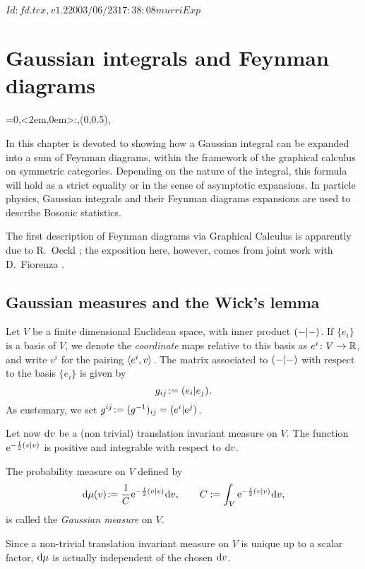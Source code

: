 \RCSID $Id: fd.tex,v 1.2 2003/06/23 17:38:08 murri Exp $


\chapter{Gaussian integrals and Feynman diagrams}
\label{sec:fd}
\everyxy={0,<2em,0em>:,(0,0.5),} %

In this chapter is devoted to showing how a Gaussian integral can be
expanded into a sum of Feynman diagrams, within the framework of the
graphical calculus on symmetric categories.  Depending on the nature
of the integral, this formula will hold as a strict equality or in the
sense of asymptotic expansions. In particle physics, Gaussian
integrals and their Feynman diagrams expansions are used to describe
Bosonic statistics.

The first description of Feynman diagrams via Graphical Calculus is
apparently due to R.~Oeckl \cite{oeckl;braided-qft}; the exposition
here, however, comes from joint work with D.~Fiorenza
\cite{murri-fiorenza;feynman}. 


\section{Gaussian measures and the Wick's lemma} 

Let $V$ be a finite dimensional Euclidean space,
with inner product $( -|- )_{}$. If $\{e_i\}$ is a basis of
$V$, we denote the \emph{coordinate} maps relative to this basis as
$e^i\colon V\to\mathbb{R}$, and write $v^i$ for the pairing
$\langle e^i,v \rangle_{}$.  The matrix associated to $( -|- )_{}$ with
respect to the basis $\{e_i\}$ is given by
\begin{equation*}
  g_{ij} \joinrel:= \inner{e_i}{e_j}.
\end{equation*}
As customary, we set $g^{ij} \joinrel:= (g^{-1})_{ij} = \inner{e^i}{e^j}$.

Let now $\mathrm{d} v$ be a (non trivial) translation invariant measure on
$V$. The function $\mathrm{e}^{-\frac{1}{2}( v|v )_{}}$ is positive and
integrable with respect to $\mathrm{d} v$.
\begin{definition}\label{dfn:gaussian-measure}
  The probability measure on $V$ defined by
  \begin{equation*}
    \ud\mu(v) \joinrel:= \frac{1}{C} \E^{-\onehalf\inner{v}{v}} \ud v, 
    \qquad
    C := {\int_V \E^{-\onehalf\inner{v}{v}} \ud v},
  \end{equation*}
  is called the \emph{Gaussian measure} on $V$.
\end{definition}
Since a non-trivial translation invariant measure on $V$ is unique up
to a scalar factor, $\mathrm{d}\mu$ is actually independent of the chosen
$\mathrm{d} v$.

